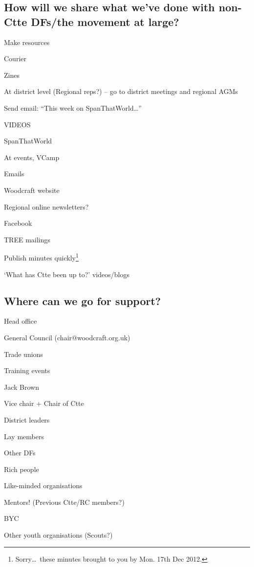 \documentclass[a4paper, 12pt]{article}
\begin{document}
\subsection{How will we share what we've done with non-Ctte DFs/the movement at large?}
\begin{itemize*}
	\item Make resources
	\item Courier
	\item Zines
	\item At district level (Regional reps?) -- go to district meetings and regional AGMs
	\item Send email: ``This week on SpanThatWorld\ldots''
	\item VIDEOS
	\item SpanThatWorld
	\item At events, VCamp
	\item Emails
	\item Woodcraft website
	\item Regional online newsletters?
	\item Facebook
	\item TREE mailings
	\item Publish minutes quickly\footnote{Sorry\ldots~these minutes brought to you by Mon. 17th Dec 2012.}
	\item `What has Ctte been up to?' videos/blogs
\end{itemize*}

\subsection{Where can we go for support?}
\begin{itemize*}
	\item Head office
	\item General Council (chair@woodcraft.org.uk)
	\item Trade unions
	\item Training events
	\item Jack Brown
	\item Vice chair + Chair of Ctte
	\item District leaders
	\item Lay members
	\item Other DFs
	\item Rich people
	\item Like-minded organisations
	\item Mentors! (Previous Ctte/RC members?)
	\item BYC
	\item Other youth organisations (Scouts?)
\end{itemize*}
\end{document}
